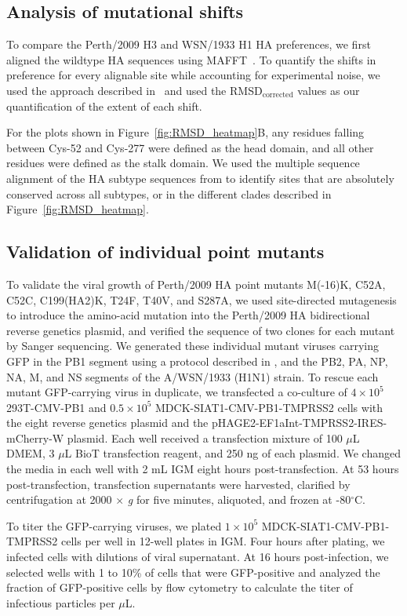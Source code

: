 \documentclass[9pt,twocolumn,twoside]{pnas-new}
\begin{document}
{\subsection*{Analysis of mutational shifts}
To compare the Perth/2009 H3 and WSN/1933 H1 HA preferences, we first aligned the wildtype HA sequences using MAFFT~\cite{katoh2013mafft}.
To quantify the shifts in preference for every alignable site while accounting for experimental noise, we used the approach described in~\cite{haddox2018mapping} and used the RMSD$_{\text{corrected}}$ values as our quantification of the extent of each shift.

For the plots shown in Figure~\ref{fig:RMSD_heatmap}B, any residues falling between Cys-52 and Cys-277 were defined as the head domain, and all other residues were defined as the stalk domain.
We used the multiple sequence alignment of the HA subtype sequences from \cite{doud2018quantifying} to identify sites that are absolutely conserved across all subtypes, or in the different clades described in Figure~\ref{fig:RMSD_heatmap}.

\subsection*{Validation of individual point mutants}
To validate the viral growth of Perth/2009 HA point mutants M(-16)K, C52A, C52C, C199(HA2)K, T24F, T40V, and S287A, we used site-directed mutagenesis to introduce the amino-acid mutation into the Perth/2009 HA bidirectional reverse genetics plasmid, and verified the sequence of two clones for each mutant by Sanger sequencing.
We generated these individual mutant viruses carrying GFP in the PB1 segment using a protocol described in \cite{hooper2013mutant}, and the PB2, PA, NP, NA, M, and NS segments of the A/WSN/1933 (H1N1) strain.
To rescue each mutant GFP-carrying virus in duplicate, we transfected a co-culture of $4 \times 10^5$ 293T-CMV-PB1 and $0.5 \times 10^5$ MDCK-SIAT1-CMV-PB1-TMPRSS2 cells with the eight reverse genetics plasmid and the pHAGE2-EF1aInt-TMPRSS2-IRES-mCherry-W plasmid.
Each well received a transfection mixture of 100 $\mu$L DMEM, 3 $\mu$L BioT transfection reagent, and 250 ng of each plasmid.
We changed the media in each well with 2 mL IGM eight hours post-transfection.
At 53 hours post-transfection, transfection supernatants were harvested, clarified by centrifugation at 2000 $\times$ \textit{g} for five minutes, aliquoted, and frozen at -80$^\circ$C.

To titer the GFP-carrying viruses, we plated $1 \times 10^5$ MDCK-SIAT1-CMV-PB1-TMPRSS2 cells per well in 12-well plates in IGM.
Four hours after plating, we infected cells with dilutions of viral supernatant.
At 16 hours post-infection, we selected wells with 1 to 10\% of cells that were GFP-positive and analyzed the fraction of GFP-positive cells by flow cytometry to calculate the titer of infectious particles per $\mu$L.

}
\end{document}
